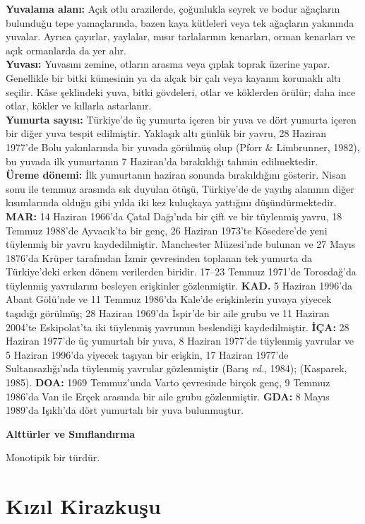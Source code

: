 \documentclass[
  10.5pt,
  a4paper,
  DIV=11,
  numbers=noendperiod,
  twocolumn]{scrreprt}
\begin{document}
\textbf{Yuvalama alanı:} Açık otlu arazilerde, çoğunlukla seyrek ve
bodur ağaçların bulunduğu tepe yamaçlarında, bazen kaya kütleleri veya
tek ağaçların yakınında yuvalar. Ayrıca çayırlar, yaylalar, mısır
tarlalarının kenarları, orman kenarları ve açık ormanlarda da yer
alır.\\
\textbf{Yuvası:} Yuvasını zemine, otların arasına veya çıplak toprak
üzerine yapar. Genellikle bir bitki kümesinin ya da alçak bir çalı veya
kayanın korunaklı altı seçilir. Kâse şeklindeki yuva, bitki gövdeleri,
otlar ve köklerden örülür; daha ince otlar, kökler ve kıllarla
astarlanır.\\
\textbf{Yumurta sayısı:} Türkiye'de üç yumurta içeren bir yuva ve dört
yumurta içeren bir diğer yuva tespit edilmiştir. Yaklaşık altı günlük
bir yavru, 28 Haziran 1977'de Bolu yakınlarında bir yuvada görülmüş olup
(Pforr \& Limbrunner, 1982), bu yuvada ilk yumurtanın 7 Haziran'da
bırakıldığı tahmin edilmektedir.\\
\textbf{Üreme dönemi:} İlk yumurtanın haziran sonunda bırakıldığını
gösterir. Nisan sonu ile temmuz arasında sık duyulan ötüşü, Türkiye'de
de yayılış alanının diğer kısımlarında olduğu gibi yılda iki kez
kuluçkaya yattığını düşündürmektedir. \textbf{MAR:} 14 Haziran 1966'da
Çatal Dağı'nda bir çift ve bir tüylenmiş yavru, 18 Temmuz 1988'de
Ayvacık'ta bir genç, 26 Haziran 1973'te Kösedere'de yeni tüylenmiş bir
yavru kaydedilmiştir. Manchester Müzesi'nde bulunan ve 27 Mayıs 1876'da
Krüper tarafından İzmir çevresinden toplanan tek yumurta da Türkiye'deki
erken dönem verilerden biridir. 17--23 Temmuz 1971'de Torosdağ'da
tüylenmiş yavrularını besleyen erişkinler gözlenmiştir. \textbf{KAD.} 5
Haziran 1996'da Abant Gölü'nde ve 11 Temmuz 1986'da Kale'de erişkinlerin
yuvaya yiyecek taşıdığı görülmüş; 28 Haziran 1969'da İspir'de bir aile
grubu ve 11 Haziran 2004'te Eskipolat'ta iki tüylenmiş yavrunun
beslendiği kaydedilmiştir. \textbf{İÇA:} 28 Haziran 1977'de üç yumurtalı
bir yuva, 8 Haziran 1977'de tüylenmiş yavrular ve 5 Haziran 1996'da
yiyecek taşıyan bir erişkin, 17 Haziran 1977'de Sultansazlığı'nda
tüylenmiş yavrular gözlenmiştir (Barış \emph{vd.}, 1984); (Kasparek,
1985). \textbf{DOA:} 1969 Temmuz'unda Varto çevresinde birçok genç, 9
Temmuz 1986'da Van ile Erçek arasında bir aile grubu gözlenmiştir.
\textbf{GDA:} 8 Mayıs 1989'da Işıklı'da dört yumurtalı bir yuva
bulunmuştur.

\textbf{Alttürler ve Sınıflandırma}

Monotipik bir türdür.

\section{Kızıl Kirazkuşu}\label{kux131zux131l-kirazkuux15fu}
\end{document}

